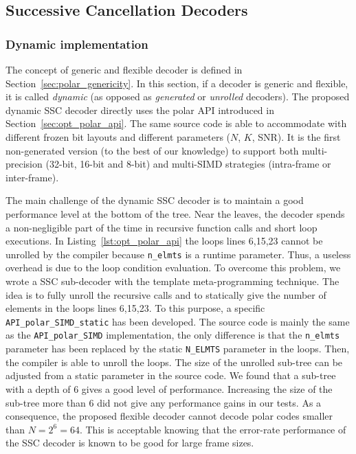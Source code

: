 \subsection{Successive Cancellation Decoders}

\subsubsection{Dynamic implementation}

The concept of generic and flexible decoder is defined in
Section~\ref{sec:polar_genericity}. In this section, if a decoder is generic and
flexible, it is called \emph{dynamic} (as opposed as \emph{generated} or
\emph{unrolled} decoders). The proposed dynamic SSC decoder directly uses the
polar API introduced in Section~\ref{sec:opt_polar_api}. The same source code is
able to accommodate with different frozen bit layouts and different parameters
($N$, $K$, SNR). It is the first non-generated version (to the best of our
knowledge) to support both multi-precision (32-bit, 16-bit and 8-bit) and
multi-SIMD strategies (intra-frame or inter-frame).

The main challenge of the dynamic SSC decoder is to maintain a good performance
level at the bottom of the tree. Near the leaves, the decoder spends a
non-negligible part of the time in recursive function calls and short loop
executions. In Listing~\ref{lst:opt_polar_api} the loops lines 6,15,23 cannot
be unrolled by the compiler because \verb|n_elmts| is a runtime parameter. Thus,
a useless overhead is due to the loop condition evaluation. To overcome this
problem, we wrote a SSC sub-decoder with the template meta-programming
technique. The idea is to fully unroll the recursive calls and to statically
give the number of elements in the loops lines 6,15,23. To this purpose, a
specific \verb|API_polar_SIMD_static| has been developed. The source code is
mainly the same as the \verb|API_polar_SIMD| implementation, the only difference
is that the \verb|n_elmts| parameter has been replaced by the static
\verb|N_ELMTS| parameter in the loops. Then, the compiler is able to unroll
the loops. The size of the unrolled sub-tree can be adjusted from a static
parameter in the source code. We found that a sub-tree with a depth of 6 gives
a good level of performance. Increasing the size of the sub-tree more than 6 did
not give any performance gains in our tests. As a consequence, the proposed
flexible decoder cannot decode polar codes smaller than $N = 2^6 = 64$. This is
acceptable knowing that the error-rate performance of the SSC decoder is known
to be good for large frame sizes.


